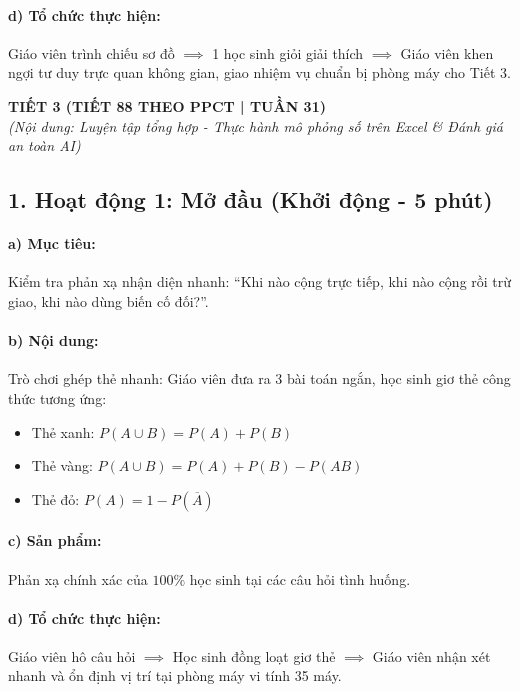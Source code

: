 \documentclass[12pt, a4paper]{article}
\begin{document}
\paragraph{d) Tổ chức thực hiện:} Giáo viên trình chiếu sơ đồ $\implies$ 1 học sinh giỏi giải thích $\implies$ Giáo viên khen ngợi tư duy trực quan không gian, giao nhiệm vụ chuẩn bị phòng máy cho Tiết 3.

\newpage

\begin{center}
    \textbf{\large TIẾT 3 (TIẾT 88 THEO PPCT | TUẦN 31)}\\[4pt]
    \textit{(Nội dung: Luyện tập tổng hợp - Thực hành mô phỏng số trên Excel \& Đánh giá an toàn AI)}
\end{center}

\subsection*{1. Hoạt động 1: Mở đầu (Khởi động - 5 phút)}

\paragraph{a) Mục tiêu:} Kiểm tra phản xạ nhận diện nhanh: ``Khi nào cộng trực tiếp, khi nào cộng rồi trừ giao, khi nào dùng biến cố đối?''.

\paragraph{b) Nội dung:} Trò chơi ghép thẻ nhanh: Giáo viên đưa ra 3 bài toán ngắn, học sinh giơ thẻ công thức tương ứng:
\begin{itemize}[leftmargin=0.6cm]
    \item Thẻ xanh: $P(A \cup B) = P(A) + P(B)$
    \item Thẻ vàng: $P(A \cup B) = P(A) + P(B) - P(AB)$
    \item Thẻ đỏ: $P(A) = 1 - P(\overline{A})$
\end{itemize}

\paragraph{c) Sản phẩm:} Phản xạ chính xác của $100\%$ học sinh tại các câu hỏi tình huống.

\paragraph{d) Tổ chức thực hiện:} Giáo viên hô câu hỏi $\implies$ Học sinh đồng loạt giơ thẻ $\implies$ Giáo viên nhận xét nhanh và ổn định vị trí tại phòng máy vi tính 35 máy.
\end{document}
